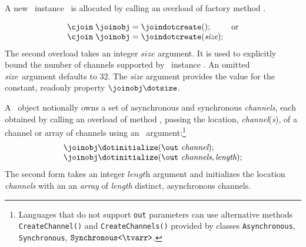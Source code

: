

A new \cjoin\ instance \joinobj\ is allocated by calling an overload of factory method . 

\[ 
\begin{array}{lr}
  \cjoin\; \joinobj = \joindotcreate(); & \mbox{or} \\ 
  \cjoin\; \joinobj = \joindotcreate(\textit{size});\\
\end{array}
\]
\noindent The second overload takes an integer $\textit{size}$ argument. It is used to explicitly bound the number of channels supported by 
\cjoin\ instance \joinobj. An omitted \textit{size}\ argument defaults to 32. 
The \textit{size} argument provides the value for the constant, readonly property $\joinobj\dotsize$.

A \cjoin\ object notionally owns a set of asynchronous and synchronous \emph{channels}, each obtained by calling an overload of
method \Initialize, passing the location, \textit{channel}(\textit{s}), of a channel or array of channels using an \out\ argument:\footnote{Languages that do not support \texttt{out} parameters can use alternative methods
\texttt{CreateChannel()} and \texttt{CreateChannels()} provided by classes \texttt{Asynchronous}, \texttt{Synchronous},
 $\texttt{Synchronous<\tvarr>}$.}
\[ 
\begin{array}{l}
  \joinobj\dotinitialize(\out\ \textit{channel});\\
  \joinobj\dotinitialize(\out\ \textit{channels}, \textit{length}); 
\end{array}
\]
\noindent The second form takes an integer $\textit{length}$ argument and initializes the location \textit{channels} with an 
an \emph{array} of \textit{length} distinct, asynchronous channels.



